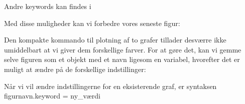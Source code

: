 \documentclass[letterpaper,10pt,english]{jupyterBook}
\begin{document}
Andre keywords kan findes i 

Med disse muligheder kan vi forbedre vores seneste figur:

\begin{sphinxVerbatim}[commandchars=\\\{\}]
                
\end{sphinxVerbatim}

\noindent{}

Den kompakte kommando til plotning af to grafer tillader desværre ikke umiddelbart at vi giver dem forskellige farver. For at gøre det, kan vi gemme selve figuren som et objekt med et navn ligesom en variabel, hvorefter det er muligt at ændre på de forskellige indstillinger:

\begin{sphinxVerbatim}[commandchars=\\\{\}]
      
\end{sphinxVerbatim}

\noindent{}

Når vi vil ændre indstillingerne for en eksisterende graf, er syntaksen figurnavn.keyword = ny\_værdi
\end{document}
